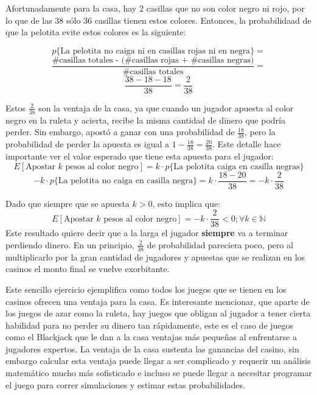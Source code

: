 Afortunadamente para la casa, hay $2$ casillas que no son color negro ni rojo, por lo que de las $38$ sólo $36$ casillas tienen estos colores. Entonces, la probabilidaad de que la pelotita evite estos colores es la siguiente:

\[p\{\text{La pelotita no caiga ni en casillas rojas ni en negra}\} =\] 
\[\frac{\text{\# casillas totales - (\# casillas rojas + \# casillas negras)}}{ \text{\# casillas totales}}  =\]
\[\frac{38-18-18}{38} = \frac{2}{38}  \]

Estos $\frac{2}{38}$ son la ventaja de la casa, ya que cuando un jugador apuesta al color negro en la ruleta y acierta, recibe la misma cantidad de dinero que podría perder. Sin embargo, apostó a ganar con una probabilidad de $\frac{18}{38}$, pero la probabilidad de perder la apuesta es igual a $1 - \frac{18}{38} = \frac{20}{38}$. Este detalle hace importante ver el valor esperado que tiene esta apuesta para el jugador:
\[E[\text{Apostar }k\text{ pesos al color negro}] = k  \cdot   p\{\text{La pelotita caiga en casilla negras}\} \]
\[- k  \cdot   p\{\text{La pelotita no caiga en casilla negra}\} = k \cdot \frac{18-20}{38}= - k \cdot \frac{2}{38}\]

Dado que siempre que se apuesta $k>0$, esto implica que:
\[E[\text{Apostar }k\text{ pesos al color negro}] = - k \cdot \frac{2}{38} < 0; \forall k \in \mathbb{N} \]
Este resultado quiere decir que a la larga el jugador \textbf{siempre} va a terminar perdiendo dinero.
En un principio, $\frac{2}{38}$ de probabilidad pareciera poco, pero al multiplicarlo por la gran cantidad de jugadores y apuestas que se realizan en los casinos el monto final se vuelve exorbitante.

Este sencillo ejercicio ejemplifica como todos los juegos que se tienen en los casinos ofrecen una ventaja para la casa. Es interesante mencionar, que aparte de los juegos de azar como la ruleta, hay juegos que obligan al jugador a tener cierta habilidad para no perder su dinero tan rápidamente, este es el caso de juegos como el Blackjack que le dan a la casa ventajas más pequeñas al enfrentarse a jugadores expertos. La ventaja de la casa sustenta las ganancias del casino, sin embargo calcular esta ventaja puede llegar a ser  complicado y requerir un análisis matemático mucho más sofisticado e incluso se puede llegar a necesitar programar el juego para correr simulaciones y estimar estas probabilidades.

